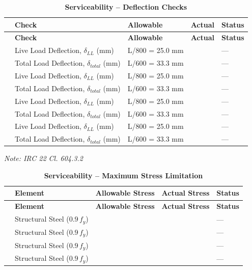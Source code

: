 \documentclass[12pt,a4paper]{report}
\numberwithin{table}{chapter}
\numberwithin{figure}{chapter}
\newcommand{\ReportTableGap}{\vspace{1em}}
\begin{document}
\ReportTableGap
\begin{longtable}{|C{2.5cm}|L{3.5cm}|C{3.5cm}|>{\centering\arraybackslash}p{3.5cm}|C{2.5cm}|}
\caption{\textbf{Serviceability -- Deflection Checks}}\\
\hline
\textbf{} & \textbf{Check} & \textbf{Allowable} & \textbf{Actual} & \textbf{Status} \\[6pt]
\hline
\endfirsthead
\hline
\textbf{} & \textbf{Check} & \textbf{Allowable} & \textbf{Actual} & \textbf{Status} \\[6pt]
\hline
\endhead

 & Live Load Deflection, $\delta_{LL}$ (mm) & L/800 = 25.0 mm &  & --- \\[6pt]
 & Total Load Deflection, $\delta_{total}$ (mm) & L/600 = 33.3 mm &  & --- \\[6pt]
\hline
{} & Live Load Deflection, $\delta_{LL}$ (mm) & L/800 = 25.0 mm &  & --- \\[6pt]
 & Total Load Deflection, $\delta_{total}$ (mm) & L/600 = 33.3 mm &  & --- \\[6pt]
\hline
{} & Live Load Deflection, $\delta_{LL}$ (mm) & L/800 = 25.0 mm &  & --- \\[6pt]
 & Total Load Deflection, $\delta_{total}$ (mm) & L/600 = 33.3 mm &  & --- \\[6pt]
\hline
{} & Live Load Deflection, $\delta_{LL}$ (mm) & L/800 = 25.0 mm &  & --- \\[6pt]
 & Total Load Deflection, $\delta_{total}$ (mm) & L/600 = 33.3 mm &  & --- \\[6pt]
\hline
\end{longtable}
\noindent\textit{Note: IRC 22 Cl. 604.3.2}

\ReportTableGap
\begin{longtable}{|C{2.5cm}|L{3.5cm}|C{3.5cm}|>{\centering\arraybackslash}p{3.5cm}|C{2.5cm}|}
\caption{\textbf{Serviceability -- Maximum Stress Limitation}}\\
\hline
\textbf{} & \textbf{Element} & \textbf{Allowable Stress} & \textbf{Actual Stress} & \textbf{Status} \\[6pt]
\hline
\endfirsthead
\hline
\textbf{} & \textbf{Element} & \textbf{Allowable Stress} & \textbf{Actual Stress} & \textbf{Status} \\[6pt]
\hline
\endhead

 & Structural Steel ($0.9\,f_y$) &  &  & --- \\[6pt]
\hline
{} & Structural Steel ($0.9\,f_y$) &  &  & --- \\[6pt]
\hline
{} & Structural Steel ($0.9\,f_y$) &  &  & --- \\[6pt]
\hline
{} & Structural Steel ($0.9\,f_y$) &  &  & --- \\[6pt]
\hline
\end{longtable}
\end{document}
